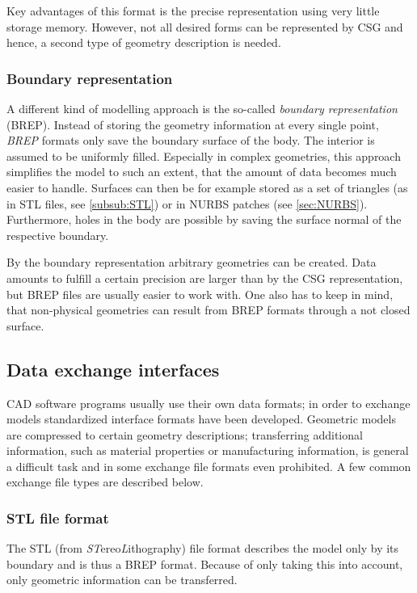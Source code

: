 Key advantages of this format is the precise representation using very little storage memory. However, not all desired forms can be represented by CSG and hence, a second type of geometry description is needed. 
\subsubsection{Boundary representation}
A different kind of modelling approach is the so-called \emph{boundary representation} (BREP). Instead of storing the geometry information at every single point, \emph{BREP} formats only save the boundary surface of the body. The interior is assumed to be uniformly filled. Especially in complex geometries, this approach simplifies the model to such an extent, that the amount of data becomes much easier to handle. Surfaces can then be for example stored as a set of triangles (as in STL files, see \autoref{subsub:STL}) or in NURBS patches (see \autoref{sec:NURBS}).
Furthermore, holes in the body are possible by saving the surface normal of the respective boundary. 

By the boundary representation arbitrary geometries can be created. Data amounts to fulfill a certain precision are larger than by the CSG representation, but BREP files are usually easier to work with. One also has to keep in mind, that non-physical geometries can result from BREP formats through a not closed surface.
\subsection{Data exchange interfaces}
CAD software programs usually use their own data formats; in order to exchange models standardized interface formats have been developed. Geometric models are compressed to certain geometry descriptions; transferring additional information, such as material properties or manufacturing information, is general a difficult task and in some exchange file formats even prohibited. A few common exchange file types are described below.
\subsubsection{STL file format} \label{subsub:STL}
The STL (from \emph{ST}ereo\emph{L}ithography) file format describes the model only by its boundary and is thus a BREP format. Because of only taking this into account, only geometric information can be transferred. 

